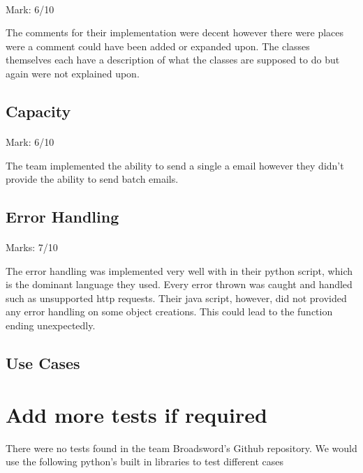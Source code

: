 \documentclass[11pt]{article}
\begin{document}
		\paragraph{} Mark: 6/10 
		\noindent
		\begin{center}
			The comments for their implementation were decent however there were places were a comment could have been added or expanded upon. The classes themselves each have a description of what the classes are supposed to do but again were not explained upon.
		\end{center}
	\subsection{Capacity}
		\paragraph{} Mark: 6/10
		\noindent
		\begin{center}
			The team implemented the ability to send a single a email however they didn't provide the ability to send batch emails.
		\end{center}
	\subsection{Error Handling}
	    	\paragraph{} Marks: 7/10
		\noindent
		\begin{center}
			The error handling was implemented very well with in their python script, which is the dominant language they used. Every error thrown was caught and handled such as unsupported http requests. Their java script, however, did not provided any error handling on some object creations. This could lead to the function ending unexpectedly.
		\end{center}
	\subsection{Use Cases} 
		\paragraph{}

\section{Add more tests if required}
	There were no tests found in the team Broadsword's Github repository. We would use the following python's built in libraries to test different cases
\end{document}
